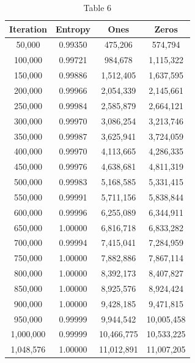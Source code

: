 \documentclass[preprint]{sigplanconf}
\begin{document}
\begin{table}
    \begin{center}
        \begin{tabular}{|c|c|c|c|}
            \hline
            \textbf{Iteration} & \textbf{Entropy} & \textbf{Ones} & \textbf{Zeros} \\
            \hline
            50,000             & 0.99350          & 475,206       & 574,794        \\
            100,000            & 0.99721          & 984,678       & 1,115,322      \\
            150,000            & 0.99886          & 1,512,405     & 1,637,595      \\
            200,000            & 0.99966          & 2,054,339     & 2,145,661      \\
            250,000            & 0.99984          & 2,585,879     & 2,664,121      \\
            300,000            & 0.99970          & 3,086,254     & 3,213,746      \\
            350,000            & 0.99987          & 3,625,941     & 3,724,059      \\
            400,000            & 0.99970          & 4,113,665     & 4,286,335      \\
            450,000            & 0.99976          & 4,638,681     & 4,811,319      \\
            500,000            & 0.99983          & 5,168,585     & 5,331,415      \\
            550,000            & 0.99991          & 5,711,156     & 5,838,844      \\
            600,000            & 0.99996          & 6,255,089     & 6,344,911      \\
            650,000            & 1.00000          & 6,816,718     & 6,833,282      \\
            700,000            & 0.99994          & 7,415,041     & 7,284,959      \\
            750,000            & 1.00000          & 7,882,886     & 7,867,114      \\
            800,000            & 1.00000          & 8,392,173     & 8,407,827      \\
            850,000            & 1.00000          & 8,925,576     & 8,924,424      \\
            900,000            & 1.00000          & 9,428,185     & 9,471,815      \\
            950,000            & 0.99999          & 9,944,542     & 10,005,458     \\
            1,000,000          & 0.99999          & 10,466,775    & 10,533,225     \\
            1,048,576          & 1.00000          & 11,012,891    & 11,007,205     \\
            \hline
        \end{tabular}
        \caption{Table 6}
        \label{tab-6}
    \end{center}
\end{table}
\end{document}
